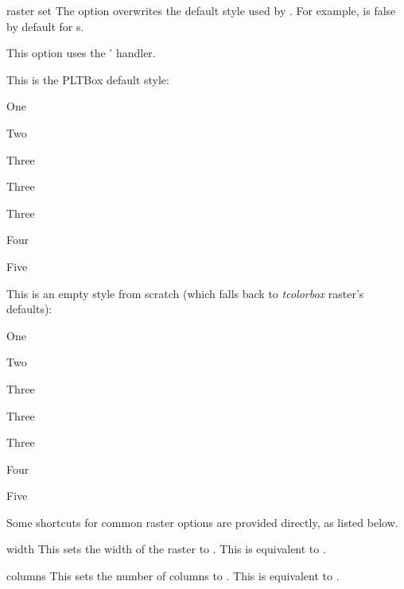 \documentclass[a4paper, 11pt]{article}
\begin{document}
\begin{optiondef}{raster set}{}{}
    The option  overwrites the default style used by . For example,  is false by default for s.

    This option uses the '  handler.

    \begin{example}{}
        This is the PLTBox default style:\par
        \begin{PLTBoxRaster}
            \item One
            \item Two
            \item Three\par Three\par Three
            \item Four
            \item Five
        \end{PLTBoxRaster}

        This is an empty style from scratch (which falls back to \textsl{tcolorbox} raster's defaults):\par
        \begin{PLTBoxRaster}[raster set = {}]
            \item One
            \item Two
            \item Three\par Three\par Three
            \item Four
            \item Five
        \end{PLTBoxRaster}
    \end{example}
\end{optiondef}

Some shortcuts for common raster options are provided directly, as listed below.

\begin{optiondef}{width}{}{}
    This sets the width of the raster to . This is equivalent to .
\end{optiondef}

\begin{optiondef}{columns}{}{}
    This sets the number of columns to . This is equivalent to .
\end{optiondef}
\end{document}
